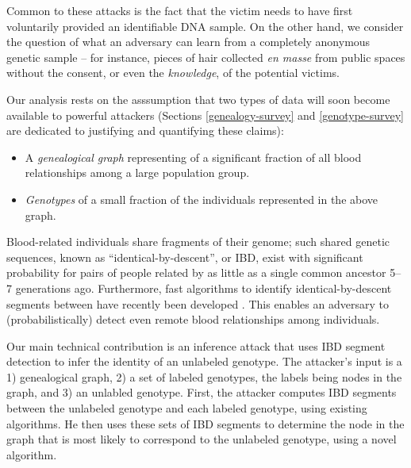 \documentclass{article}
\begin{document}
Common to these attacks is the fact that the victim needs to have first voluntarily provided an identifiable DNA sample. On the other hand, we consider the question of what an adversary can learn from a completely anonymous genetic sample -- for instance, pieces of hair collected {\em en masse} from public spaces without the consent, or even the {\em knowledge}, of the potential victims.

Our analysis rests on the asssumption that two types of data will soon become available to powerful attackers (Sections \ref{genealogy-survey} and \ref{genotype-survey} are dedicated to justifying and quantifying these claims):
\begin{itemize}
\item
A {\em genealogical graph} representing of a significant fraction of all blood relationships among a large population group.
\item
{\em Genotypes} of a small fraction of the individuals represented in the above graph.
\end{itemize}

Blood-related individuals share fragments of their genome; such shared genetic sequences, known as ``identical-by-descent'', or IBD, exist with significant probability for pairs of people related by as little as a single common ancestor 5--7 generations ago. Furthermore, fast algorithms to identify identical-by-descent segments between have recently been developed \cite{germline}. This enables an adversary to (probabilistically) detect even remote blood relationships among individuals.

Our main technical contribution is an inference attack that uses IBD segment detection to infer the identity of an unlabeled genotype. The attacker's input is a 1) genealogical graph, 2) a set of labeled genotypes, the labels being nodes in the graph, and 3) an unlabled genotype. First, the attacker computes IBD segments between the unlabeled genotype and each labeled genotype, using existing algorithms. He then uses these sets of IBD segments to determine the node in the graph that is most likely to correspond to the unlabeled genotype, using a novel algorithm.
\end{document}
